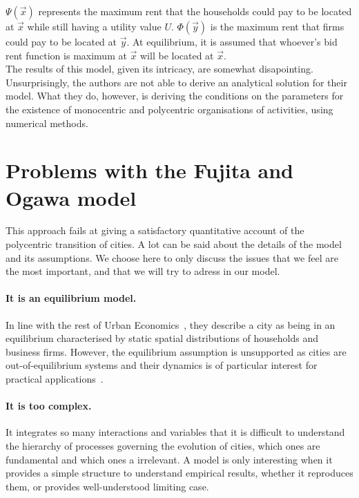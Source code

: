 $\Psi(\vec{x})$ represents the maximum rent that the households could pay to be
located at $\vec{x}$ while still having a utility value $U$. $\Phi(\vec{y})$ is
the maximum rent that firms could pay to be located at $\vec{y}$. At
equilibrium, it is assumed that whoever's bid rent function is maximum at
$\vec{x}$ will be located at $\vec{x}$.\\

The results of this model, given its intricacy, are somewhat disapointing.
Unsurprisingly, the authors are not able to derive an analytical solution for
their model. What they do, however, is deriving the conditions on the parameters
for the existence of monocentric and polycentric organisations of activities,
using numerical methods.

\section{Problems with the Fujita and Ogawa model}
\label{sec:problems_with_the_fujita_and_ogawa_model}

This approach fails at giving a satisfactory quantitative account  of the
polycentric transition of cities. A lot can be said about the details of the
model and its assumptions. We choose here to only discuss the issues that we
feel are the most important, and that we will try to adress in our model. 

\paragraph{It is an equilibrium model.} In line with the rest of Urban
Economics~\cite{Fujita:2001, Fujita:2013}, they describe a city as being in
an equilibrium characterised by static spatial distributions of households and
business firms. However, the equilibrium assumption is unsupported as cities are
out-of-equilibrium systems and their dynamics is of particular interest for
practical applications~\cite{Batty:2008}.\\

\paragraph{It is too complex.} It integrates so many interactions and
variables that it is difficult to understand the hierarchy of processes
governing the evolution of cities, which ones are fundamental and which ones a
irrelevant. A model is only interesting when it
provides a simple structure to understand empirical results, whether it
reproduces them, or provides well-understood limiting case. 

